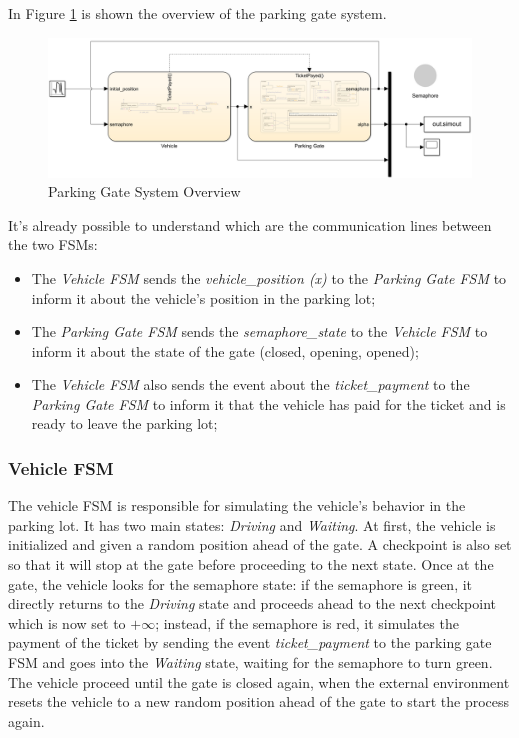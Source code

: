In Figure \ref{fig:parking_gate_system_overview} is shown the overview of the parking gate system.

\begin{figure}[H]
    \centering
    \includegraphics[width=1.0\textwidth]{./img/MATLAB/parking_gate_system_overview.png}
    \caption{Parking Gate System Overview}
    \label{fig:parking_gate_system_overview}
\end{figure}

It's already possible to understand which are the communication lines between the two FSMs:

\begin{itemize}
    \item The \textit{Vehicle FSM} sends the \textit{vehicle\_position (x)} to the \textit{Parking Gate FSM} to inform it about the vehicle's position in the parking lot;
    \item The \textit{Parking Gate FSM} sends the \textit{semaphore\_state} to the \textit{Vehicle FSM} to inform it about the state of the gate (closed, opening, opened);
    \item The \textit{Vehicle FSM} also sends the event about the \textit{ticket\_payment} to the \textit{Parking Gate FSM} to inform it that the vehicle has paid for the ticket and is ready to leave the parking lot;
\end{itemize}


\subsubsection{Vehicle FSM}
\label{subsubsec:vehicle_fsm}

The vehicle FSM is responsible for simulating the vehicle's behavior in the parking lot.
It has two main states: \textit{Driving} and \textit{Waiting}.
At first, the vehicle is initialized and given a random position ahead of the gate.
A checkpoint is also set so that it will stop at the gate before proceeding to the next state.
Once at the gate, the vehicle looks for the semaphore state: if the semaphore is green, it directly returns to the \textit{Driving} state and proceeds ahead to the next checkpoint which is now set to $+\infty$; instead, if the semaphore is red, it simulates the payment of the ticket by sending the event \textit{ticket\_payment} to the parking gate FSM and goes into the \textit{Waiting} state, waiting for the semaphore to turn green.
The vehicle proceed until the gate is closed again, when the external environment resets the vehicle to a new random position ahead of the gate to start the process again.

